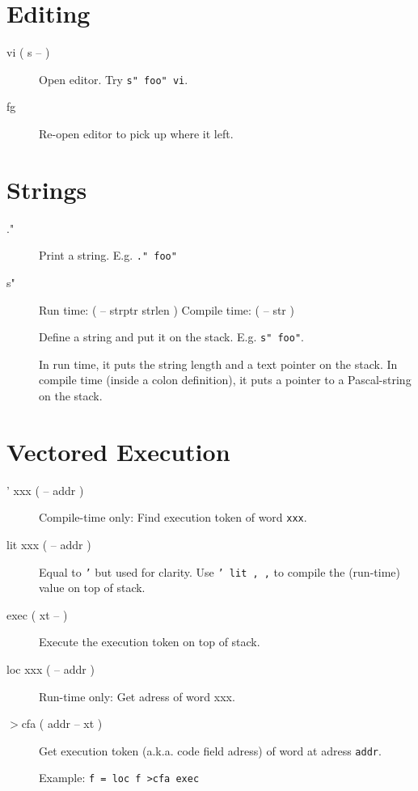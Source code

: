 \section{Editing}

\begin{description}
\item[vi ( s -- )]

Open editor. Try \texttt{s" foo" vi}.

\item[fg]

Re-open editor to pick up where it left.

\end{description}

\section{Strings}

\begin{description}
\item[."]

Print a string. E.g. \texttt{." foo"}

\item[s"] Run time: ( -- strptr strlen ) Compile time: ( -- str )

Define a string and put it on the stack. E.g. \texttt{s" foo"}. 

In run time, it puts the string length and a text pointer on the stack. In compile time (inside a colon definition), it puts a pointer to a Pascal-string on the stack.

\end{description}


\section{Vectored Execution}

\begin{description}
\item[' xxx ( -- addr )] Compile-time only: Find execution token of word \texttt{xxx}.
\item[lit xxx ( -- addr )] Equal to \texttt{'} but used for clarity. Use \texttt{' lit , ,} to compile the (run-time) value on top of stack.
\item[exec ( xt -- )] Execute the execution token on top of stack.
\item[loc xxx ( -- addr )] Run-time only: Get adress of word xxx.
\item[$>$cfa ( addr -- xt )] Get execution token (a.k.a. code field adress) of word at adress \texttt{addr}.

Example: \texttt{f = loc f >cfa exec}
\end{description}


